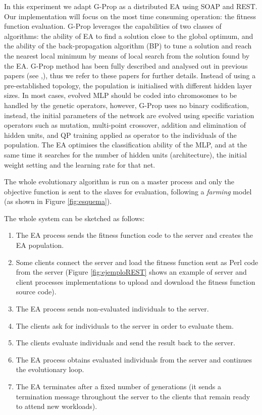 \documentclass[final,1p,times]{elsarticle}
\begin{document}
In this experiment we adapt G-Prop as a distributed EA using SOAP and REST. Our implementation will focus on the most time consuming operation: the fitness function evaluation.
G-Prop leverages the capabilities of two classes of algorithms: the ability of EA to find a solution close to the global optimum, and the ability of the back-propagation algorithm (BP) to tune a solution and reach the nearest local minimum by means of local search from the solution found by the EA. 
G-Prop method has been fully described and analysed out in previous papers (see \cite{CastilloNPL},\cite{castilloNC}), thus we refer to these papers for further details.
Instead of using a pre-established topology, the population is initialised with different hidden layer sizes.
In most cases, evolved MLP should be coded into chromosomes to be handled by the genetic operators, however, G-Prop uses no binary codification, instead, the initial parameters of the network are evolved using specific variation operators such as mutation, multi-point crossover, addition and elimination of hidden units, and QP training applied as operator to the individuals of the population.
The EA optimises the classification ability of the MLP, and at the same time it searches for the number of hidden units (architecture), the initial weight setting and the learning rate for that net.


The whole evolutionary algorithm is run on a master process and only the objective function is sent to the slaves for evaluation, following a {\em farming} model (as shown in Figure \ref{fig:esquema}).

The whole system can be sketched as follows:
\begin{enumerate}
  \item The EA process sends the fitness function code to the server and creates the EA population.
  \item Some clients connect the server and load the fitness function sent as Perl code from the server (Figure \ref{fig:ejemploREST} shows an example of server and client processes implementations to upload and download the fitness function source code).
  \item The EA process sends non-evaluated individuals to the server.
  \item The clients ask for individuals to the server in order to evaluate them.
  \item The clients evaluate individuals and send the result back to the server.
  \item The EA process obtains evaluated individuals from the server and continues the evolutionary loop.
  \item The EA terminates after a fixed number of generations (it sends a termination message throughout the server to the clients that remain ready to attend new workloads).
\end{enumerate}
\end{document}
